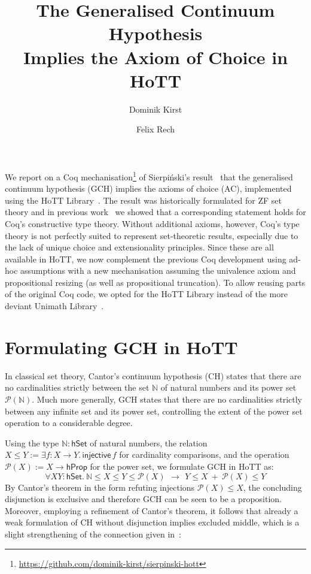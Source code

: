 \documentclass{easychair}
\title{The Generalised Continuum Hypothesis\\Implies the Axiom of Choice in HoTT}
\author{Dominik Kirst \and Felix Rech}
\institute{Saarland University, Saarland Informatics Campus, Germany}
\newcommand{\nat}{\mathbb{N}}
\newcommand{\pow}{\mathcal{P}}
\newcommand{\hprop}{\mathsf{hProp}}
\newcommand{\hset}{\mathsf{hSet}}
\begin{document}
\maketitle

We report on a Coq mechanisation\footnote{\url{https://github.com/dominik-kirst/sierpinski-hott}} of Sierpi\'nski's result~\cite{sierpinski1947hypothese} that the generalised continuum hypothesis (GCH) implies the axioms of choice (AC), implemented using the HoTT Library~\cite{bauer2017hott}.
The result was historically formulated for ZF set theory and in previous work~\cite{kirst2021generalised} we showed that a corresponding statement holds for Coq's constructive type theory.
Without additional axioms, however, Coq's type theory is not perfectly suited to represent set-theoretic results, especially due to the lack of unique choice and extensionality principles.
Since these are all available in HoTT, we now complement the previous Coq development using ad-hoc assumptions with a new mechanisation assuming the univalence axiom and propositional resizing (as well as propositional truncation).
To allow reusing parts of the original Coq code, we opted for the HoTT Library instead of the more deviant Unimath Library~\cite{UniMath}.

\section{Formulating GCH in HoTT}

In classical set theory, Cantor's continuum hypothesis (CH) states that there are no cardinalities strictly between the set $\nat$ of natural numbers and its power set $\pow(\nat)$.
Much more generally, GCH states that there are no cardinalities strictly between any infinite set and its power set, controlling the extent of the power set operation to a considerable degree.

Using the type $\nat:\hset$ of natural numbers, the relation $X\le Y:=\exists f:X\to Y.\, \mathsf{injective}\,f$ for cardinality comparisons, and the operation $\pow(X):=X\to\hprop$ for the power set, we formulate GCH in HoTT as:
$$\forall X Y:\hset.~\nat \le X\le Y\le \pow(X)~\,\to~\, Y\le X ~+~ \pow(X)\le Y$$
By Cantor's theorem in the form refuting injections $\pow(X)\le X$, the concluding disjunction is exclusive and therefore GCH can be seen to be a proposition.
Moreover, employing a refinement of Cantor's theorem, it follows that already a weak formulation of CH without disjunction implies excluded middle, which is a slight strengthening of the connection given in~\cite{bridges2016continuum}:
\end{document}
